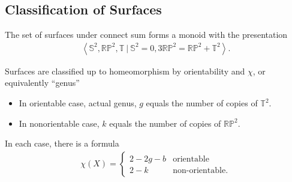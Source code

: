 \hypertarget{classification-of-surfaces}{%
\subsection{Classification of
Surfaces}\label{classification-of-surfaces}}

\begin{theorem}

The set of surfaces under connect sum forms a monoid with the
presentation
\begin{align*}  
\left\langle{ {\mathbb{S}}^2, {\mathbb{RP}}^2, {\mathbb{T}}{~\mathrel{\Big|}~}{\mathbb{S}}^2 = 0, 3{\mathbb{RP}}^2 = {\mathbb{RP}}^2 + {\mathbb{T}}^2}\right\rangle
.\end{align*}

Surfaces are classified up to homeomorphism by orientability and
\(\chi\), or equivalently ``genus''

\begin{itemize}
\tightlist
\item
  In orientable case, actual genus, \(g\) equals the number of copies of
  \({\mathbb{T}}^2\).
\item
  In nonorientable case, \(k\) equals the number of copies of
  \({\mathbb{RP}}^2\).
\end{itemize}

In each case, there is a formula
\begin{align*}  
\chi(X) = 
\begin{cases}
2-2g - b & \text{orientable} \\
2 - k & \text{non-orientable}.
\end{cases}
\end{align*}

\end{theorem}

